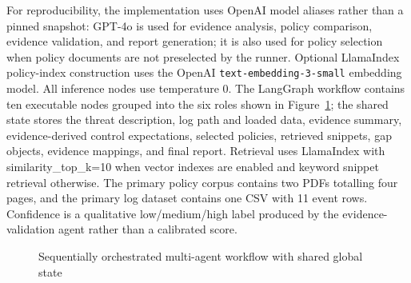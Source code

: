 \documentclass[conference]{IEEEtran}
\begin{document}
For reproducibility, the implementation uses OpenAI model aliases rather than a pinned snapshot: GPT-4o is used for evidence analysis, policy comparison, evidence validation, and report generation; it is also used for policy selection when policy documents are not preselected by the runner. Optional LlamaIndex policy-index construction uses the OpenAI \texttt{text-embedding-3-small} embedding model. All inference nodes use temperature 0. The LangGraph workflow contains ten executable nodes grouped into the six roles shown in Figure~\ref{fig:workflow}; the shared state stores the threat description, log path and loaded data, evidence summary, evidence-derived control expectations, selected policies, retrieved snippets, gap objects, evidence mappings, and final report. Retrieval uses LlamaIndex with similarity\_top\_k=10 when vector indexes are enabled and keyword snippet retrieval otherwise. The primary policy corpus contains two PDFs totalling four pages, and the primary log dataset contains one CSV with 11 event rows. Confidence is a qualitative low/medium/high label produced by the evidence-validation agent rather than a calibrated score.

\begin{figure}[h]
\centering
{}
\caption{Sequentially orchestrated multi-agent workflow with shared global state}
\label{fig:workflow}
\end{figure}
\end{document}

